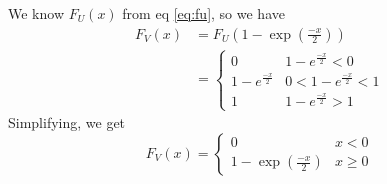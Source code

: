 \documentclass[journal, 12pt, twocolumn]{IEEEtran}
\begin{document}
\begin{enumerate}[label=\arabic{section}.\arabic*]
        We know $F_U(x)$ from eq \eqref{eq:fu}, so we have
        \begin{align}
            F_V(x) &= F_U \left(1 - \exp \left(\frac{-x}{2}\right)\right) \\
            &= \begin{cases}
                0 & 1 - e^{\frac{-x}{2}} < 0 \\
                1 - e^{\frac{-x}{2}} & 0 < 1 - e^{\frac{-x}{2}} < 1 \\
                1 & 1 - e^{\frac{-x}{2}} > 1
            \end{cases}
        \end{align}
        Simplifying, we get
        \begin{equation}
            F_V(x) = \begin{cases}
                0 & x < 0 \\
                1 - \exp \left(\frac{-x}{2}\right) & x \geq 0
            \end{cases}
        \end{equation}
\end{enumerate}
\end{document}
